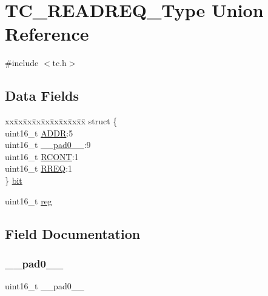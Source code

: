 \hypertarget{union_t_c___r_e_a_d_r_e_q___type}{}\section{T\+C\+\_\+\+R\+E\+A\+D\+R\+E\+Q\+\_\+\+Type Union Reference}
\label{union_t_c___r_e_a_d_r_e_q___type}


{\ttfamily \#include $<$tc.\+h$>$}

\subsection*{Data Fields}
\begin{DoxyCompactItemize}
\item 
\begin{tabbing}
xx\=xx\=xx\=xx\=xx\=xx\=xx\=xx\=xx\=\kill
struct \{\\
\>uint16\_t \mbox{\hyperlink{union_t_c___r_e_a_d_r_e_q___type_af23088f0ffe25072ffa5ef29e495780e}{ADDR}}:5\\
\>uint16\_t \mbox{\hyperlink{union_t_c___r_e_a_d_r_e_q___type_a77132c2c26a75f5b8751b235cda23828}{\_\_pad0\_\_}}:9\\
\>uint16\_t \mbox{\hyperlink{union_t_c___r_e_a_d_r_e_q___type_a25bffea6638615e449f26f4c3d5caef7}{RCONT}}:1\\
\>uint16\_t \mbox{\hyperlink{union_t_c___r_e_a_d_r_e_q___type_ab04769594ab04e8b80a1165d5bd5794e}{RREQ}}:1\\
\} \mbox{\hyperlink{union_t_c___r_e_a_d_r_e_q___type_ac0011818144c2b06c616d7c49dee6111}{bit}}\\

\end{tabbing}\item 
uint16\+\_\+t \mbox{\hyperlink{union_t_c___r_e_a_d_r_e_q___type_a11760f5020019f4aa8cb02e694f7cc44}{reg}}
\end{DoxyCompactItemize}


\subsection{Field Documentation}
\mbox{\label{union_t_c___r_e_a_d_r_e_q___type_a77132c2c26a75f5b8751b235cda23828}} 
\subsubsection{\texorpdfstring{\_\_pad0\_\_}{\_\_pad0\_\_}}
{\footnotesize\ttfamily uint16\+\_\+t \+\_\+\+\_\+pad0\+\_\+\+\_\+}

